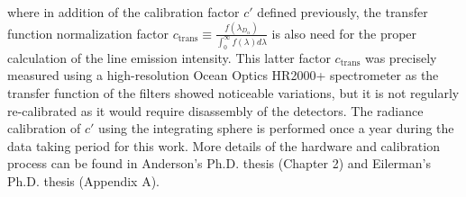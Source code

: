 where in addition of the calibration factor $c'$ defined previously, the transfer function normalization factor $c_{\text{trans}} \equiv \frac{f(\lambda_{D_{\alpha}})}{\int_0^{\infty}f(\lambda)d\lambda}$ is also need for the proper calculation of the line emission intensity. This latter factor $c_{\text{trans}}$ was precisely measured using a high-resolution Ocean Optics HR2000+ spectrometer as the transfer function of the filters showed noticeable variations\cite{Eilerman}, but it is not regularly re-calibrated as it would require disassembly of the detectors. The radiance calibration of $c'$ using the integrating sphere is performed once a year during the data taking period for this work. More details of the hardware and calibration process can be found in Anderson's Ph.D. thesis\cite{Anderson2001} (Chapter 2) and Eilerman's Ph.D. thesis\cite{Eilerman} (Appendix A).